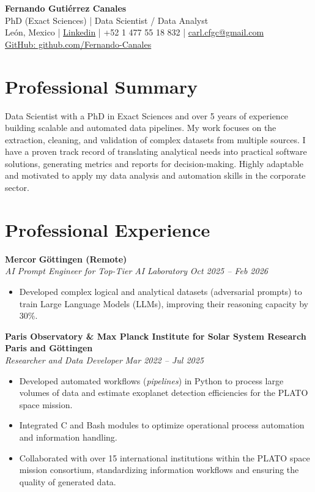 \documentclass[10pt,a4paper]{article}
\begin{document}
\begin{center}
    {\Huge \textbf{Fernando Gutiérrez Canales}}\\
    {\Large PhD (Exact Sciences) | Data Scientist / Data Analyst}\\    
    León, Mexico \quad | \quad \href{https://www.linkedin.com/in/fernando-guti%C3%A9rrez-canales-804876343/}{Linkedin} \quad |
    \quad +52 1 477 55 18 832 \quad | \quad \href{mailto:carl.cfgc@gmail.com}{carl.cfgc@gmail.com} \\
     \href{https://github.com/Fernando-Canales}{GitHub: github.com/Fernando-Canales}
\end{center}

\vspace{1em}

\section*{Professional Summary}
Data Scientist with a PhD in Exact Sciences and over 5 years of experience building scalable and automated data pipelines. My work focuses on the extraction, cleaning, and validation of complex datasets from multiple sources. I have a proven track record of translating analytical needs into practical software solutions, generating metrics and reports for decision-making. Highly adaptable and motivated to apply my data analysis and automation skills in the corporate sector.

\section*{Professional Experience}
\textbf{Mercor} \hfill \textbf{Göttingen (Remote)} \\
\textit{AI Prompt Engineer for Top-Tier AI Laboratory} \hfill \textit{Oct 2025 -- Feb 2026}
\begin{itemize}
	\item Developed complex logical and analytical datasets (adversarial prompts) to train Large Language Models (LLMs), improving their reasoning capacity by 30\%.
\end{itemize}

\textbf{Paris Observatory \& Max Planck Institute for Solar System Research} \hfill \textbf{Paris and Göttingen} \\
\textit{Researcher and Data Developer} \hfill \textit{Mar 2022 -- Jul 2025}
\begin{itemize}[leftmargin=1.5em]
    \item Developed automated workflows (\textit{pipelines}) in Python to process large volumes of data and estimate exoplanet detection efficiencies for the PLATO space mission.
    \item Integrated C and Bash modules to optimize operational process automation and information handling.
    \item Collaborated with over 15 international institutions within the PLATO space mission consortium, standardizing information workflows and ensuring the quality of generated data.
\end{itemize}
\end{document}
